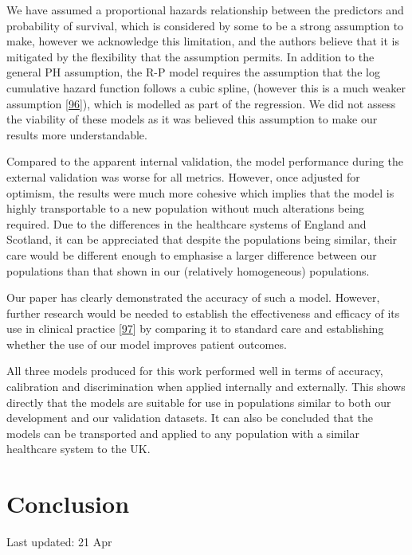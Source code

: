 \documentclass[12pt,PhD,twoside,openright]{muthesis}
\begin{document}
We have assumed a proportional hazards relationship between the predictors and probability of survival, which is considered by some to be a strong assumption to make, however we acknowledge this limitation, and the authors believe that it is mitigated by the flexibility that the assumption permits. In addition to the general PH assumption, the R-P model requires the assumption that the log cumulative hazard function follows a cubic spline, (however this is a much weaker assumption {[}\protect\hyperlink{ref-royston_flexible_2002}{96}{]}), which is modelled as part of the regression. We did not assess the viability of these models as it was believed this assumption to make our results more understandable.

Compared to the apparent internal validation, the model performance during the external validation was worse for all metrics. However, once adjusted for optimism, the results were much more cohesive which implies that the model is highly transportable to a new population without much alterations being required. Due to the differences in the healthcare systems of England and Scotland, it can be appreciated that despite the populations being similar, their care would be different enough to emphasise a larger difference between our populations than that shown in our (relatively homogeneous) populations.

Our paper has clearly demonstrated the accuracy of such a model. However, further research would be needed to establish the effectiveness and efficacy of its use in clinical practice {[}\protect\hyperlink{ref-moons_prognosis_2009-1}{97}{]} by comparing it to standard care and establishing whether the use of our model improves patient outcomes.

All three models produced for this work performed well in terms of accuracy, calibration and discrimination when applied internally and externally. This shows directly that the models are suitable for use in populations similar to both our development and our validation datasets. It can also be concluded that the models can be transported and applied to any population with a similar healthcare system to the UK.

\hypertarget{chap-conclusion}{%
\chapter{Conclusion}\label{chap-conclusion}}


Last updated: 21 Apr
\end{document}

